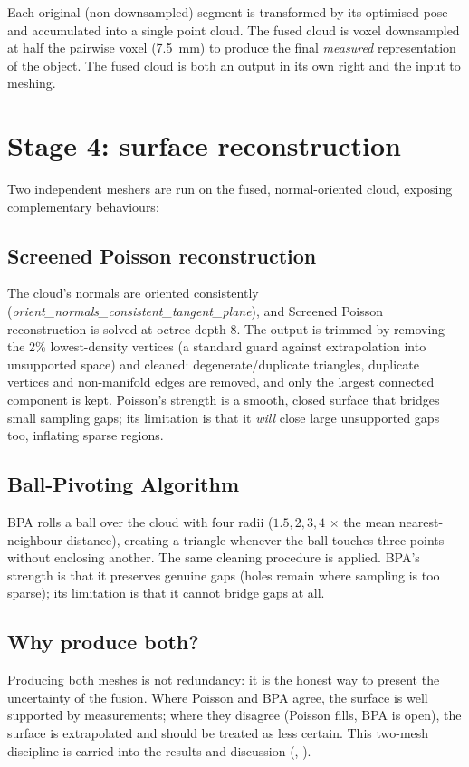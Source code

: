 Each original (non-downsampled) segment is transformed by its optimised pose
and accumulated into a single point cloud. The fused cloud is voxel
downsampled at half the pairwise voxel (7.5~mm) to produce the final
\emph{measured} representation of the object. The fused cloud is both an
output in its own right and the input to meshing.

\section{Stage 4: surface reconstruction}
\label{sec:routea_meshing}

Two independent meshers are run on the fused, normal-oriented cloud, exposing
complementary behaviours:

\subsection{Screened Poisson reconstruction}
The cloud's normals are oriented consistently
(\emph{orient\_normals\_consistent\_tangent\_plane}), and Screened Poisson
reconstruction \citep{kazhdan2006poisson,kazhdan2013screened} is solved at
octree depth 8. The output is trimmed by removing the 2\% lowest-density
vertices (a standard guard against extrapolation into unsupported space) and
cleaned: degenerate/duplicate triangles, duplicate vertices and non-manifold
edges are removed, and only the largest connected component is kept.
Poisson's strength is a smooth, closed surface that bridges small sampling
gaps; its limitation is that it \emph{will} close large unsupported gaps too,
inflating sparse regions.

\subsection{Ball-Pivoting Algorithm}
BPA \citep{bernardini1999ball} rolls a ball over the cloud with four radii
($1.5, 2, 3, 4$ $\times$ the mean nearest-neighbour distance), creating a
triangle whenever the ball touches three points without enclosing another.
The same cleaning procedure is applied. BPA's strength is that it preserves
genuine gaps (holes remain where sampling is too sparse); its limitation is
that it cannot bridge gaps at all.

\subsection{Why produce both?}
Producing both meshes is not redundancy: it is the honest way to present the
uncertainty of the fusion. Where Poisson and BPA agree, the surface is well
supported by measurements; where they disagree (Poisson fills, BPA is open),
the surface is extrapolated and should be treated as less certain. This
two-mesh discipline is carried into the results and discussion
(, ).

